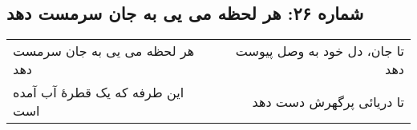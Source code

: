 \begin{center}
\section*{شماره ۲۶: هر لحظه می یی به جان سرمست دهد}
\label{sec:026}
\begin{longtable}{l p{0.5cm} r}
هر لحظه می یی به جان سرمست دهد
&&
تا جان، دل خود به وصل پیوست دهد
\\
این طرفه که یک قطرهٔ آب آمده است
&&
تا دریائی پرگهرش دست دهد
\\
\end{longtable}
\end{center}

